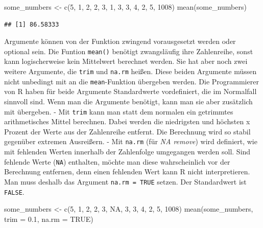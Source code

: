 \documentclass[
]{book}
\newenvironment{Shaded}{\begin{snugshade}}{\end{snugshade}}
\newcommand{\AttributeTok}[1]{\textcolor[rgb]{0.77,0.63,0.00}{#1}}
\newcommand{\ConstantTok}[1]{\textcolor[rgb]{0.00,0.00,0.00}{#1}}
\newcommand{\DecValTok}[1]{\textcolor[rgb]{0.00,0.00,0.81}{#1}}
\newcommand{\FloatTok}[1]{\textcolor[rgb]{0.00,0.00,0.81}{#1}}
\newcommand{\FunctionTok}[1]{\textcolor[rgb]{0.00,0.00,0.00}{#1}}
\newcommand{\NormalTok}[1]{#1}
\newcommand{\OtherTok}[1]{\textcolor[rgb]{0.56,0.35,0.01}{#1}}
\begin{document}
\begin{Shaded}
\begin{Highlighting}[]
\NormalTok{some\_numbers }\OtherTok{\textless{}{-}} \FunctionTok{c}\NormalTok{(}\DecValTok{5}\NormalTok{, }\DecValTok{1}\NormalTok{, }\DecValTok{2}\NormalTok{, }\DecValTok{2}\NormalTok{, }\DecValTok{3}\NormalTok{, }\DecValTok{1}\NormalTok{, }\DecValTok{3}\NormalTok{, }\DecValTok{3}\NormalTok{, }\DecValTok{4}\NormalTok{, }\DecValTok{2}\NormalTok{, }\DecValTok{5}\NormalTok{, }\DecValTok{1008}\NormalTok{)}
\FunctionTok{mean}\NormalTok{(some\_numbers)}
\end{Highlighting}
\end{Shaded}

\begin{verbatim}
## [1] 86.58333
\end{verbatim}

Argumente können von der Funktion zwingend vorausgesetzt werden oder optional sein. Die Funtion \texttt{mean()} benötigt zwangsläufig ihre Zahlenreihe, sonst kann logischerweise kein Mittelwert berechnet werden. Sie hat aber noch zwei weitere Argumente, die \texttt{trim} und \texttt{na.rm} heißen. Diese beiden Argumente müssen nicht unbedingt mit an die \texttt{mean}-Funktion übergeben werden. Die Programmierer von R haben für beide Argumente Standardwerte vordefiniert, die im Normalfall sinnvoll sind. Wenn man die Argumente benötigt, kann man sie aber zusätzlich mit übergeben.
- Mit \texttt{trim} kann man statt dem normalen ein getrimmtes arithmetisches Mittel berechnen. Dabei werden die niedrigsten und höchsten x Prozent der Werte aus der Zahlenreihe entfernt. Die Berechnung wird so stabil gegenüber extremen Ausreißern.
- Mit \texttt{na.rm} (für \emph{NA remove}) wird definiert, wie mit fehlenden Werten innerhalb der Zahlenfolge umgegangen werden soll. Sind fehlende Werte (\texttt{NA}) enthalten, möchte man diese wahrscheinlich vor der Berechnung entfernen, denn einen fehlenden Wert kann R nicht interpretieren. Man muss deshalb das Argument \texttt{na.rm\ =\ TRUE} setzen. Der Standardwert ist \texttt{FALSE}.

\begin{Shaded}
\begin{Highlighting}[]
\NormalTok{some\_numbers }\OtherTok{\textless{}{-}} \FunctionTok{c}\NormalTok{(}\DecValTok{5}\NormalTok{, }\DecValTok{1}\NormalTok{, }\DecValTok{2}\NormalTok{, }\DecValTok{2}\NormalTok{, }\DecValTok{3}\NormalTok{, }\ConstantTok{NA}\NormalTok{, }\DecValTok{3}\NormalTok{, }\DecValTok{3}\NormalTok{, }\DecValTok{4}\NormalTok{, }\DecValTok{2}\NormalTok{, }\DecValTok{5}\NormalTok{, }\DecValTok{1008}\NormalTok{)}
\FunctionTok{mean}\NormalTok{(some\_numbers, }\AttributeTok{trim =} \FloatTok{0.1}\NormalTok{, }\AttributeTok{na.rm =} \ConstantTok{TRUE}\NormalTok{)}
\end{Highlighting}
\end{Shaded}
\end{document}
